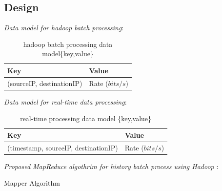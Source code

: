 \documentclass[conference]{IEEEtran}
\begin{document}
\subsection{Design}\label{sec:design}
\emph{Data model for hadoop batch processing}:

\begin{table}[h]
	\centering
	\small
	\caption{hadoop batch processing data model\{key,value\}}
	\label{table:knowledge table}
	\begin{tabular}{|l|l|}
	\hline
	Key & Value   \\\hline
	\big(sourceIP, destinationIP\big)  & Rate \big($bits/s$\big)   \\\hline
	\end{tabular}
\end{table}

\emph{Data model for real-time data processing}:

\begin{table}[h]
	\centering
	\small
	\caption{real-time processing data model \{key,value\}}
	\label{table:knowledge table}
	\begin{tabular}{|l|l|}
	\hline
	Key & Value   \\\hline
	\big(timestamp, sourceIP, destinationIP\big)  & Rate \big($bits/s$\big)   \\\hline
	\end{tabular}
\end{table}


\emph{Proposed MapReduce algothrim for history batch process using Hadoop }:

\IncMargin{1em}
\LinesNumbered
\begin{algorithm}[!ht]

    \For{$f$ $\in$ $N_f$,  $ip$ $\in$ $IP_{src,dst}$}{
        		\If{$ip$ in $IP_{src, dst}$}{
        			$print$ $\big(IP_{src,dst}$, $R_{flow}$  \big)
        		}
    		}
    \caption{Mapper Algorithm}
    \label{mapper_algorithm}
\end{algorithm}
\DecMargin{1em}
\end{document}
